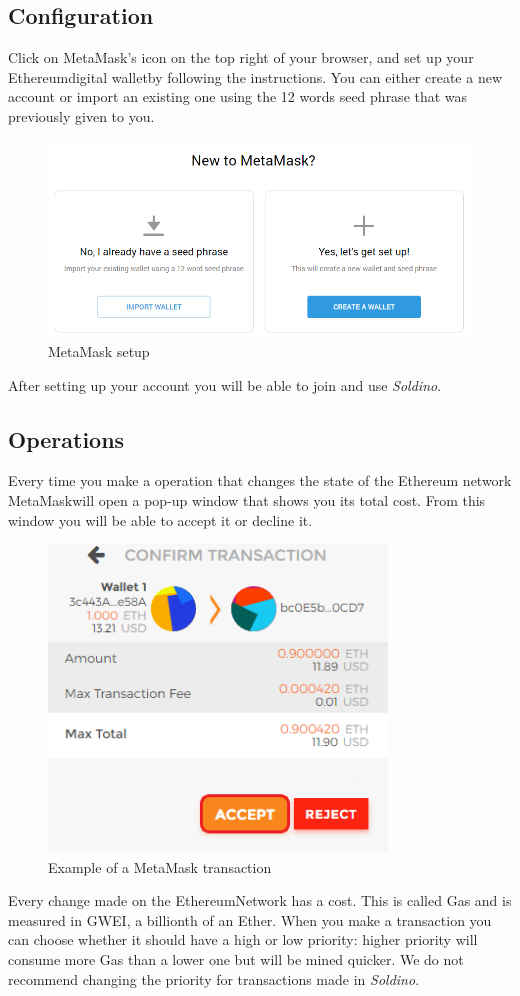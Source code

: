 	\subsection{Configuration}
	Click on MetaMask's icon on the top right of your browser, and set up your 
	Ethereum\glosp digital wallet\glosp by following the instructions. You can either 
	create a new account or import an existing one using the 12 words seed phrase
	that was previously given to you.
	\begin{figure}[H]
		\includegraphics[width=15cm]{res/images/metamask_select.png}
		\centering
		\caption{MetaMask setup}
	\end{figure}
	\noindent After setting up your account you will be able to join and use 
	\textit{Soldino}.
	\subsection{Operations}
	Every time you make a operation that changes the state of the Ethereum\glosp 
	network MetaMask\glosp will open a pop-up window that shows you its total cost.
	From this window you will be able to accept it or decline it.\\
	\begin{figure}[H]
		\includegraphics[width=9cm]{res/images/metamask_transaction.png}
		\centering
		\caption{Example of a MetaMask transaction}
	\end{figure}
	\noindent 
	Every change made on the Ethereum\glosp Network has a cost. This is called Gas 
	and is measured in GWEI, a billionth of an Ether\glo. When you make a 
	transaction you can choose whether it should have a high or low priority: 
	higher priority will consume more Gas than a lower one but will be mined 
	quicker. We do not recommend changing the priority for transactions made 
	in \textit{Soldino}.
